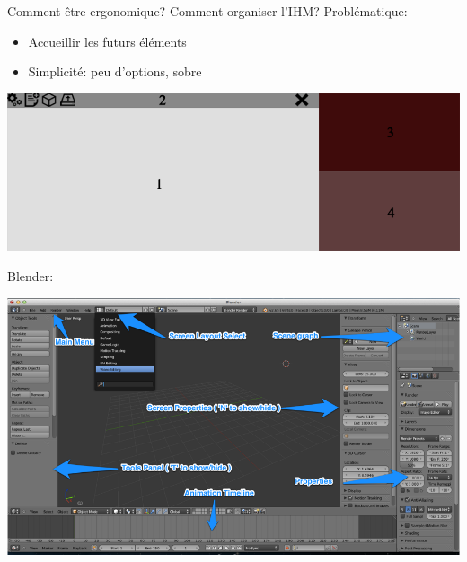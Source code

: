 \documentclass[a4paper,10pt]{beamer}
\begin{document}
			
			\begin{frame}{Comment être ergonomique?}
				Comment organiser l'IHM?
				Problématique:
				\begin{itemize}
					\item Accueillir les futurs éléments
					\item Simplicité: peu d'options, sobre
				\end{itemize}

				\centerline{\includegraphics[scale=0.2]{images/Nono/img6.png}}
			Blender:
				\centerline{\includegraphics[scale=0.2]{images/Nono/img5.png}} 
			\end{frame}
		
\end{document}
